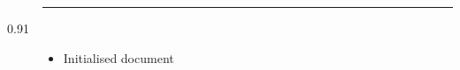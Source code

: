 \documentclass[a4paper, 10pt]{article}
\begin{document}
\begin{description}
                                                                                                                                                                        \rule{\textwidth}{1pt}
                                                                                                                                                                            \item [0.91] \begin{itemize}
                                                                                                                                                                                                \renewcommand\labelitemi{--}
                                                                                                                                                                                                        \item Initialised document
                                                                                                                                                                                                                \end{itemize}
\end{description}
\end{document}

